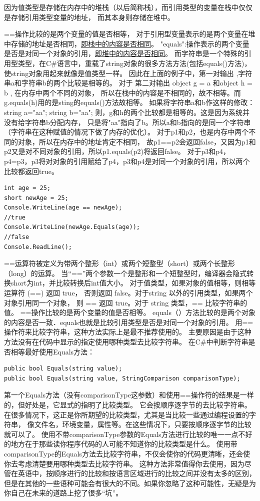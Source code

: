 \documentclass{book}
\begin{document}
因为值类型是存储在内存中的堆栈（以后简称栈），而引用类型的变量在栈中仅仅是存储引用类型变量的地址，
而其本身则存储在堆中。

==操作比较的是两个变量的值是否相等，
对于引用型变量表示的是两个变量在堆中存储的地址是否相同，\underline{即栈中的内容是否相同}。
"equals":操作表示的两个变量是否是对同一个对象的引用，\underline{即堆中的内容是否相同}。
而字符串是一个特殊的引用型类型，在C\#语言中，重载了string对象的很多方法方法(包括equals()方法)，
使string对象用起来就像是值类型一样。
因此在上面的例子中，第一对输出 ,字符串a和字符串b的两个比较是相等的。
对于 第二对输出 object g = a 和object h = b , 在内存中两个不同的对象，
所以在栈中的内容是不相同的，故不相等。而g.equals(h)用的是sting的equals()方法故相等。
如果将字符串a和b作这样的修改：
string a="aa";
string b="aa";
则，g和h的两个比较都是相等的。这是因为系统并没有给字符串b分配内存，
只是将"aa"指向了b。所以a和b指向的是同一个字符串（字符串在这种赋值的情况下做了内存的优化）。
对于p1和p2，也是内存中两个不同的对象，所以在内存中的地址肯定不相同，
故p1==p2会返回false，又因为p1和p2又是对不同对象的引用，所以p1.equals(p2)将返回false。
对于p3和p4，p4=p3，p3将对对象的引用赋给了p4，p3和p4是对同一个对象的引用，所以两个比较都返回true。

\begin{lstlisting}[language={[Sharp]C}]
int age = 25; 
short newAge = 25; 
Console.WriteLine(age == newAge);  
//true 
Console.WriteLine(newAge.Equals(age)); 
//false 
Console.ReadLine();
\end{lstlisting}

==运算符被定义为带两个整形（int）或两个短整型（short）或两个长整形（long）的运算。
当“==”两个参数一个是整形和一个短整型时，编译器会隐式转换short为int，并比较转换后int值大小。
对于值类型，如果对象的值相等，则相等运算符 (==) 返回 true，
否则返回 false。对于string 以外的引用类型，如果两个对象引用同一个对象，
则 == 返回 true。对于 string 类型，== 比较字符串的值。
==操作比较的是两个变量的值是否相等。
equals（）方法比较的是两个对象的内容是否一致．equals也就是比较引用类型是否是对同一个对象的引用。
用==操作符来比较字符串，这种方法实际上是最不推荐使用的。
主要原因是由于这种方法没有在代码中显示的指定使用哪种类型去比较字符串。
在C\#中判断字符串是否相等最好使用Equals方法：

\begin{lstlisting}[language={[Sharp]C}]
public bool Equals(string value);  
public bool Equals(string value, StringComparison comparisonType);
\end{lstlisting}

第一个Equals方法（没有comparisonType这参数）和使用==操作符的结果是一样的，但好处是，它显式的指明了比较类型。
它会按顺序逐字节的去比较字符串。在很多情况下，这正是你所期望的比较类型，尤其是当比较一些通过编程设置的字符串，
像文件名，环境变量，属性等。在这些情况下，只要按顺序逐字节的比较就可以了。
使用不带comparisonType参数的Equals方法进行比较的唯一一点不好的地方在于那些读你程序代码的人可能不知道你的比较类型是什么。
使用带comparisonType的Equals方法去比较字符串，不仅会使你的代码更清晰，还会使你去考虑清楚要用哪种类型去比较字符串。
这种方法非常值得你去使用，因为尽管在英语中，按顺序进行的比较和按语言区域进行的比较之间并没有太多的区别，
但是在其他的一些语种可能会有很大的不同。如果你忽略了这种可能性，无疑是为你自己在未来的道路上挖了很多“坑”。
\end{document}
